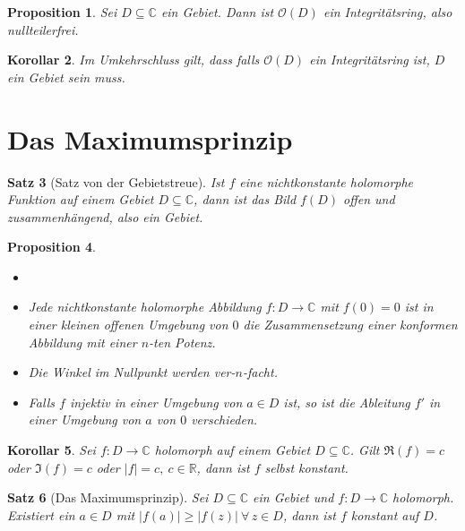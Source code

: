 \documentclass[a4paper,12pt]{book}
\theoremstyle{newthm}
\newtheorem{thm}{Satz}[section]
\newtheorem{prop}[thm]{Proposition}
\newtheorem{cor}[thm]{Korollar}
\theoremstyle{newdef}
\theoremstyle{newrem}
\newcommand{\R}{\mathbb{R}}
\newcommand{\C}{\mathbb{C}}
\renewcommand{\O}{\mathcal{O}}
\begin{document}
		\begin{prop}
			Sei $D \subseteq \C$ ein Gebiet. Dann ist $\O(D)$ ein Integritätsring, also nullteilerfrei.
		\end{prop}
		
		\begin{cor}
			Im Umkehrschluss gilt, dass falls $\O(D)$ ein Integritätsring ist, $D$ ein Gebiet sein muss.
		\end{cor}
		
	
	\section{Das Maximumsprinzip}	
		
		\begin{thm}[Satz von der Gebietstreue]\label{2.6.1}
			Ist $f$ eine nichtkonstante holomorphe Funktion auf einem Gebiet $D \subseteq \C$, dann ist das Bild $f(D)$ offen und zusammenhängend, also ein Gebiet.
		\end{thm}
		
		\begin{prop}
			\begin{itemize}
				\item[]
				\item Jede nichtkonstante holomorphe Abbildung $f: D \to \C$ mit $f(0) = 0$ ist in einer kleinen offenen Umgebung von $0$ die Zusammensetzung einer konformen Abbildung mit einer $n$-ten Potenz.
				\item Die Winkel im Nullpunkt werden ver-$n$-facht.
				\item Falls $f$ injektiv in einer Umgebung von $a \in D$ ist, so ist die Ableitung $f'$ in einer Umgebung von $a$ von $0$ verschieden.
			\end{itemize}
		\end{prop}
		
		\begin{cor}
			Sei $ f: D \to \C $ holomorph auf einem Gebiet $D \subseteq \C$. Gilt $ \Re(f)=c $ oder $ \Im(f) = c $ oder $ |f|=c,\ c \in \R $, dann ist $f$ selbst konstant.
		\end{cor}
		
		\begin{thm}[Das Maximumsprinzip]
			Sei $ D \subseteq \C $ ein Gebiet und $ f: D \to \C $ holomorph. Existiert ein $a \in D$ mit $ |f(a)| \geq |f(z)| \ \forall\, z \in D $, dann ist $f$ konstant auf $D$.
		\end{thm}
		
\end{document}
